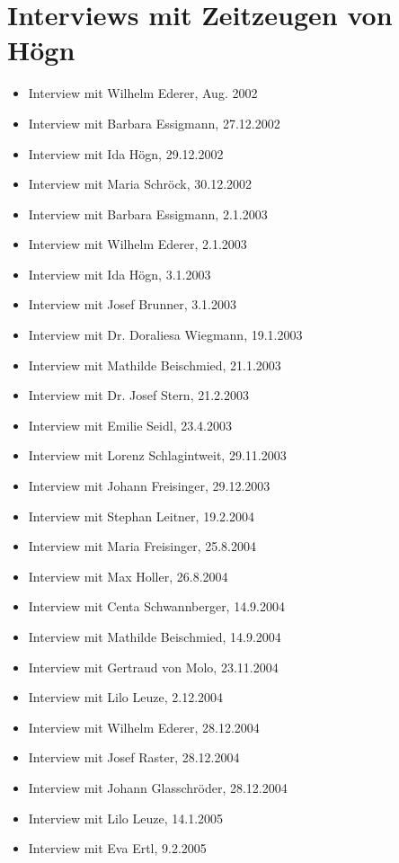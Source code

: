 \documentclass{book}
\begin{document}
\section{Interviews mit Zeitzeugen von Högn}

\begin{itemize}
\item Interview mit Wilhelm Ederer, Aug. 2002
\item Interview mit Barbara Essigmann, 27.12.2002
\item Interview mit Ida Högn, 29.12.2002
\item Interview mit Maria Schröck, 30.12.2002
\item Interview mit Barbara Essigmann, 2.1.2003
\item Interview mit Wilhelm Ederer, 2.1.2003
\item Interview mit Ida Högn, 3.1.2003
\item Interview mit Josef Brunner, 3.1.2003
\item Interview mit Dr. Doraliesa Wiegmann, 19.1.2003
\item Interview mit Mathilde Beischmied, 21.1.2003
\item Interview mit Dr. Josef Stern, 21.2.2003
\item Interview mit Emilie Seidl, 23.4.2003
\item Interview mit Lorenz Schlagintweit, 29.11.2003
\item Interview mit Johann Freisinger, 29.12.2003
\item Interview mit Stephan Leitner, 19.2.2004
\item Interview mit Maria Freisinger, 25.8.2004
\item Interview mit Max Holler, 26.8.2004
\item Interview mit Centa Schwannberger, 14.9.2004
\item Interview mit Mathilde Beischmied, 14.9.2004
\item Interview mit Gertraud von Molo, 23.11.2004
\item Interview mit Lilo Leuze, 2.12.2004
\item Interview mit Wilhelm Ederer, 28.12.2004
\item Interview mit Josef Raster, 28.12.2004
\item Interview mit Johann Glasschröder, 28.12.2004
\item Interview mit Lilo Leuze, 14.1.2005
\item Interview mit Eva Ertl, 9.2.2005
\end{itemize}
\end{document}
